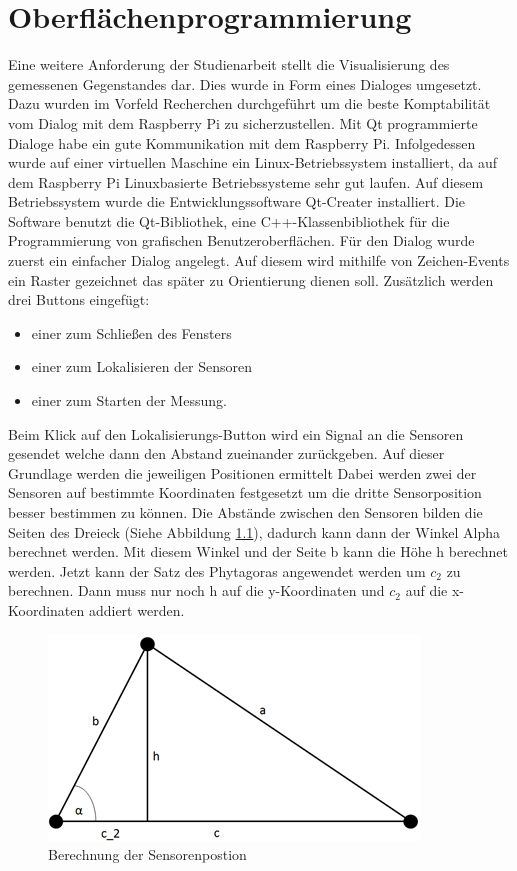 

\chapter{Oberflächenprogrammierung}
Eine weitere Anforderung der Studienarbeit stellt die Visualisierung des gemessenen Gegenstandes dar. Dies wurde in Form eines Dialoges umgesetzt. Dazu wurden im Vorfeld Recherchen durchgeführt um die beste Komptabilität vom Dialog mit dem Raspberry Pi zu sicherzustellen. Mit Qt programmierte Dialoge habe ein gute Kommunikation mit dem Raspberry Pi. Infolgedessen wurde auf einer virtuellen Maschine ein Linux-Betriebssystem installiert, da auf dem Raspberry Pi Linuxbasierte Betriebssysteme sehr gut laufen. Auf diesem Betriebssystem wurde die Entwicklungssoftware Qt-Creater installiert. Die Software benutzt die Qt-Bibliothek, eine C++-Klassenbibliothek für die Programmierung von grafischen Benutzeroberflächen. 
Für den Dialog wurde zuerst ein einfacher Dialog angelegt. Auf diesem wird mithilfe von Zeichen-Events ein Raster gezeichnet das später zu Orientierung dienen soll. Zusätzlich werden drei Buttons eingefügt:
\begin{itemize}
	\item einer zum Schließen des Fensters
	\item einer zum Lokalisieren der Sensoren
	\item einer zum Starten der Messung.
\end{itemize}
Beim Klick auf den Lokalisierungs-Button wird ein Signal an die Sensoren gesendet welche dann den Abstand zueinander zurückgeben. Auf dieser Grundlage werden die jeweiligen Positionen ermittelt Dabei werden zwei der Sensoren auf bestimmte Koordinaten festgesetzt um die dritte Sensorposition besser bestimmen zu können. Die Abstände zwischen den Sensoren bilden die Seiten des Dreieck (Siehe Abbildung \ref{img:gui1}), dadurch kann dann der Winkel Alpha berechnet werden. Mit diesem Winkel und der Seite b kann die Höhe h berechnet werden. Jetzt kann der Satz des Phytagoras angewendet werden um $c_2$ zu berechnen. Dann muss nur noch h auf die y-Koordinaten und $c_2$ auf die x-Koordinaten addiert werden.
\begin{figure}
	\centering
	\includegraphics[scale=1]{images/gui/01.png}
	\caption{Berechnung der Sensorenpostion} \label{img:gui1}
\end{figure}

